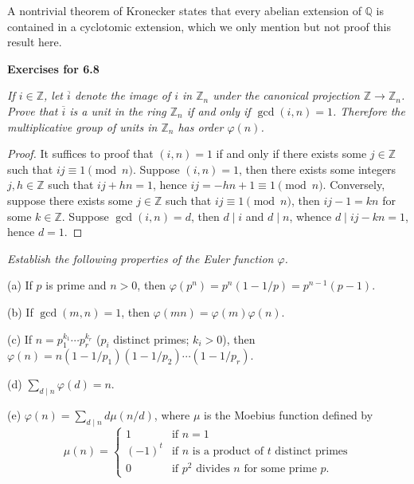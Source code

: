 A nontrivial theorem of Kronecker states that every abelian extension of $\mathbb{Q}$ is contained in a cyclotomic extension, which we only mention but not proof this result here.
\begin{center}
\begin{large}
    \textbf{Exercises for 6.8}
\end{large}
\end{center}
\begin{problem}\em
If $i\in \mathbb{Z}$, let $\overline{i}$ denote the image of $i$ in $\mathbb{Z}_n$ under the canonical projection $\mathbb{Z}\to \mathbb{Z}_n$. Prove that $\overline{i}$ is a unit in the ring $\mathbb{Z}_n$ if and only if $\gcd{(i, n)}=1$. Therefore the multiplicative group of units in $\mathbb{Z}_n$ has order $\varphi(n)$.
\end{problem}
\begin{proof}
It suffices to proof that $(i,n)=1$ if and only if there exists some $j\in\mathbb{Z}$ such that $ij\equiv 1\pmod{n}$. Suppose $(i,n)=1$, then there exists some integers $j,h\in\mathbb{Z}$ such that $ij+hn=1$, hence $ij=-hn+1\equiv 1\pmod{n}$. Conversely, suppose there exists some $j\in\mathbb{Z}$ such that $ij\equiv 1\pmod{n}$, then $ij-1=kn$ for some $k\in\mathbb{Z}$. Suppose $\gcd(i,n)=d$, then $d\mid i$ and $d\mid n$, whence $d\mid ij-kn=1$, hence $d=1$.
\end{proof}
\begin{problem}\em
Establish the following properties of the Euler function $\varphi$.\par
(a) If $p$ is prime and $n>0$, then $\varphi(p^n)=p^n(1-1/p)=p^{n-1}(p-1)$.\par
(b) If $\gcd{(m, n)}=1$, then $\varphi(mn)=\varphi(m)\varphi(n)$.\par
(c) If $n=p_1^{k_1}\cdots p_r^{k_r}$ ($p_i$ distinct primes; $k_i>0$), then $\varphi(n)=n(1-1/p_1)(1-1/p_2)\cdots (1-1/p_r)$.\par
(d) $\sum_{d\mid n}\varphi(d)=n$.\par
(e) $\varphi(n)=\sum_{d\mid n}d\mu(n/d)$, where $\mu$ is the Moebius function defined by
$$
\mu(n)=
\left\{\begin{array}{ll}
1 & \text{if }n=1 \\
(-1)^t & \text{if }n \text{ is a product of }t\text{ distinct primes}\\
0 & \text{if }p^2\text{ divides }n\text{ for some prime }p.
\end{array}\right.
$$
\end{problem}
